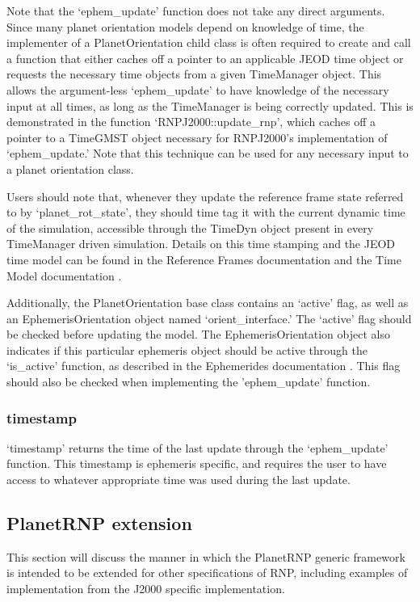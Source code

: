 Note that the `ephem\_update' function does not take any direct arguments. Since many
planet orientation models depend on knowledge of time, the implementer of a
PlanetOrientation child class is often required to create and call a function that
either caches off a pointer to an applicable JEOD time object \cite{dynenv:TIME} or
requests the necessary time objects from a given TimeManager object. This allows
the argument-less `ephem\_update' to have knowledge of the necessary input at all times,
as long as the TimeManager is being correctly updated. This is demonstrated in the
function `RNPJ2000::update\_rnp', which caches off a pointer to a TimeGMST object necessary
for RNPJ2000's implementation of `ephem\_update.' Note that this technique can be used for any
necessary input to a planet orientation class.

Users should note that, whenever they update the reference frame state referred to by
`planet\_rot\_state', they should time tag it with the current dynamic time of the simulation,
accessible through the TimeDyn object present in every TimeManager driven simulation.
Details on this time stamping and the JEOD time model can be found in the
Reference Frames documentation \cite{dynenv:REFFRAMES} and the Time Model documentation
\cite{dynenv:TIME}.

Additionally, the PlanetOrientation base class contains an `active' flag, as well
as an EphemerisOrientation object named `orient\_interface.' The `active'
flag should be checked before updating the model. The EphemerisOrientation object also
indicates if this particular ephemeris object should be active through the `is\_active'
function, as described in the Ephemerides documentation \cite{dynenv:EPHEMERIDES}. This
flag should also be checked when implementing the 'ephem\_update' function.

\subsubsection{timestamp}
`timestamp' returns the time of the last update through the `ephem\_update' function.
This timestamp is ephemeris specific, and requires the user to have access to
whatever appropriate time was used during the last update.


\subsection{PlanetRNP extension}

This section will discuss the manner in which the PlanetRNP
generic framework is intended
to be extended for other specifications of RNP, including examples of
implementation from the J2000 specific implementation.

